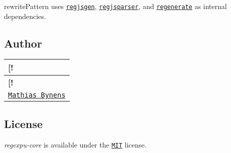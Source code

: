 {\ttfamily rewrite\+Pattern} uses \href{https://github.com/d10/regjsgen}{\tt regjsgen}, \href{https://github.com/jviereck/regjsparser}{\tt regjsparser}, and \href{https://github.com/mathiasbynens/regenerate}{\tt regenerate} as internal dependencies.

\subsection*{Author}

\tabulinesep=1mm
\begin{longtabu} spread 0pt [c]{*{1}{|X[-1]}|}
\hline
\rowcolor{\tableheadbgcolor}\textbf{ \mbox{[}!   }\\
\endfirsthead
\hline
\endfoot
\hline
\rowcolor{\tableheadbgcolor}\textbf{ \mbox{[}!   }\\
\endhead
\href{https://mathiasbynens.be/}{\tt Mathias Bynens}   \\
\end{longtabu}


\subsection*{License}

{\itshape regexpu-\/core} is available under the \href{https://mths.be/mit}{\tt M\+IT} license. 